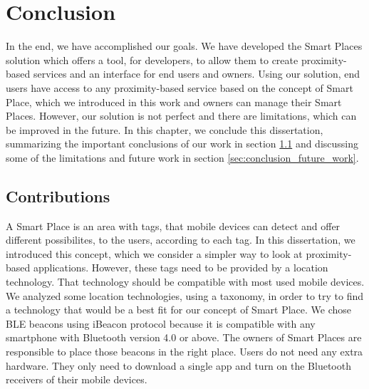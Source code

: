
\chapter{Conclusion}
\label{chapter:conclusion}
In the end, we have accomplished our goals.
We have developed the Smart Places solution which offers a tool, for developers, to allow them to create proximity-based services and an interface for end users and owners.
Using our solution, end users have access to any proximity-based service based on the concept of Smart Place, which we introduced in this work and owners can manage their Smart Places.
However, our solution is not perfect and there are limitations, which can be improved in the future.
In this chapter, we conclude this dissertation, summarizing the important conclusions of our work in section \ref{sec:conclusion_contributions} and discussing some of the limitations and future work in section \ref{sec:conclusion_future_work}.

\section{Contributions}
\label{sec:conclusion_contributions}
A Smart Place is an area with tags, that mobile devices can detect and offer different possibilites, to the users, according to each tag.
In this dissertation, we introduced this concept, which we consider a simpler way to look at proximity-based applications.
However, these tags need to be provided by a location technology.
That technology should be compatible with most used mobile devices.
We analyzed some location technologies, using a taxonomy\cite{location}, in order to try to find a technology that would be a best fit for our concept of Smart Place.
We chose \gls{BLE} beacons using iBeacon protocol because it is compatible with any smartphone with Bluetooth version 4.0 or above.
The owners of Smart Places are responsible to place those beacons in the right place.
Users do not need any extra hardware.
They only need to download a single app and turn on the Bluetooth receivers of their mobile devices.

